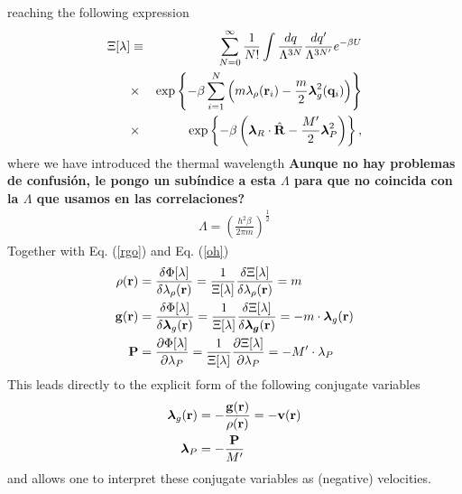 \documentclass[b5paper,openright,11pt]{book}
\newcommand{\Note}[1]{{\bf \color{red}#1}}    %
\begin{document}
reaching the following expression 
\begin{eqnarray}
\Xi [\lambda]
&\equiv&
 \sum_{N=0}^\infty \frac{1}{N!}
\int \frac{dq}{\Lambda^{3N}}\frac{dq'}{\Lambda^{3N'}}e^{-\beta U}
\nonumber\\
&\times&\exp\left\{-\beta \sum_{i=1}^N\left(m\lambda_\rho({\bf
    r}_i)-\frac{m}{2}\boldsymbol{\lambda}_{g}^2({\bf q}_i)\right)\right\}
\nonumber\\
&\times&\exp\left\{-\beta \left(\boldsymbol{\lambda}_R\cdot\hat{\bf R}-\frac{M'}{2}\boldsymbol{\lambda}_{P}^2\right)\right\},
\label{xiln2}
\end{eqnarray}
where we have introduced the thermal wavelength  \Note{Aunque no hay problemas de confusión, le pongo un subíndice a esta $\Lambda$ para que no coincida con la $\Lambda$ que usamos en las correlaciones?}
\begin{align}
\Lambda=\left(\frac{h^2\beta}{2\pi m}\right)^{\frac{1}{2}}
\label{ThermalWave}
\end{align}
Together with Eq. (\ref{rgo}) and Eq. (\ref{oh})
\begin{align}
  \rho({\bf r}) &=\frac{\delta \Phi [\lambda]}{\delta \lambda_\rho({\bf r}) } = \frac{1}{\Xi[\lambda]} \frac{\delta\Xi [\lambda]}{\delta \lambda_{\rho}({\bf r})} = m
  \nonumber\\
  {\bf g}({\bf r}) &=\frac{\delta \Phi [\lambda]}{\delta \boldsymbol{\lambda}_g({\bf r}) } =\frac{1}{\Xi[\lambda]} \frac{\delta\Xi [\lambda]}{\delta \boldsymbol{\lambda_g}({\bf r})} = -m\cdot\boldsymbol{\lambda}_g({\bf r})
 \nonumber\\
  {\bf P} &=\frac{\partial \Phi [\lambda]}{\partial \lambda_P} =\frac{1}{\Xi[\lambda]} \frac{\partial\Xi [\lambda]}{\partial \lambda_P} = -M'\cdot\lambda_P
\end{align}
This leads directly to the explicit form of the following conjugate variables
\begin{align}
 \boldsymbol{\lambda}_g({\bf r}) &= -\frac{{\bf g}({\bf r})}{\rho({\bf r})}=-{\bf v}({\bf r})
\nonumber\\
 \boldsymbol{\lambda}_P &= -\frac{{\bf P}}{M'}
\label{nu}
\end{align}
and allows  one to interpret  these conjugate variables  as (negative)
velocities.  
\end{document}
